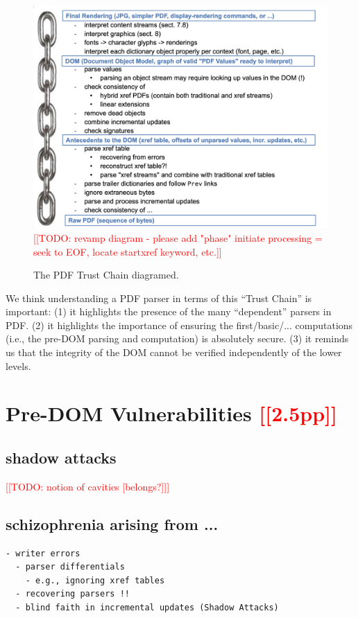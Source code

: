 \documentclass[conference,12pt]{IEEEtran}
\newcommand{\note}[1]{\noteYes{#1}}
\newcommand{\noteYes}[1]{\textcolor{red}{[[#1]]}}
\newcommand{\todo}[1]{\note{TODO: #1}}
\begin{document}
\begin{figure}[t]
    \centering
    \includegraphics[width=\linewidth]{figures/trustchain-diagram.png}
    \todo{revamp diagram - please add "phase" initiate processing = seek to EOF, locate startxref keyword, etc.}
    \caption{The PDF Trust Chain diagramed.}
    \label{fig:pdf-trust-chain}
\end{figure}

We think understanding a PDF parser in terms of this ``Trust Chain'' is
important:
(1) it highlights the presence of the many ``dependent'' parsers in PDF.
(2) it highlights the importance of ensuring the first/basic/... computations
    (i.e., the pre-DOM parsing and computation) is absolutely secure.
(3) it reminds us that the integrity of the DOM cannot be verified independently
of the lower levels.

\section{Pre-DOM Vulnerabilities \note{2.5pp}}
\label{sec:predom-vulnerabilities}

\subsection{shadow attacks}
\todo{notion of cavities [belongs?]}

\subsection{schizophrenia arising from ...}
\begin{lstlisting}[style=meta]
  - writer errors
  - parser differentials
    - e.g., ignoring xref tables
  - recovering parsers !!
  - blind faith in incremental updates (Shadow Attacks)
\end{lstlisting}
\end{document}

